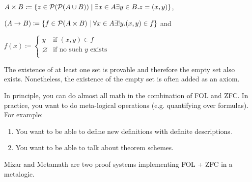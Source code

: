 \begin{boxdef}
\begin{defi}
\begin{enumerate}
        $A \times B \coloneq \{ z \in \mathcal{P}(\mathcal{P}(A \cup B)) \mid \exists x \in A \exists y \in B. z = (x, y)\}$, 
        
        $(A \to B) \coloneq \{f \in \mathcal{P}(A \times B) \mid \forall x \in A \exists! y. (x, y) \in f \}$ and
        
        $f(x) \coloneq 
        \begin{cases}
            y & \text{if } (x, y) \in f \\
            \varnothing & \text{if no such $y$ exists} \\
        \end{cases}$
    \end{enumerate}
\end{defi}
\end{boxdef}

\begin{rem}
    The existence of at least one set is provable and therefore the empty set also exists. 
    Nonetheless, the existence of the empty set is often added as an axiom.
\end{rem}

\begin{rem}
    In principle, you can do almost all math in the combination of FOL and ZFC.
    In practice, you want to do meta-logical operations (e.g. quantifying over formulas). 
    For example: 
    \begin{enumerate}
        \item You want to be able to define new definitions with definite descriptions.
        \item You want to be able to talk about theorem schemes.
    \end{enumerate}
    Mizar and Metamath are two proof systems implementing FOL + ZFC in a metalogic.
\end{rem}